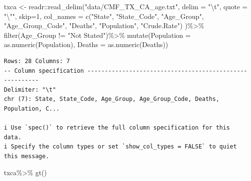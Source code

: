 \documentclass[
  letterpaper,
  DIV=11,
  numbers=noendperiod]{scrreprt}
\newenvironment{Shaded}{\begin{snugshade}}{\end{snugshade}}
\newcommand{\AttributeTok}[1]{\textcolor[rgb]{0.40,0.45,0.13}{#1}}
\newcommand{\DecValTok}[1]{\textcolor[rgb]{0.68,0.00,0.00}{#1}}
\newcommand{\FunctionTok}[1]{\textcolor[rgb]{0.28,0.35,0.67}{#1}}
\newcommand{\NormalTok}[1]{\textcolor[rgb]{0.00,0.23,0.31}{#1}}
\newcommand{\OtherTok}[1]{\textcolor[rgb]{0.00,0.23,0.31}{#1}}
\newcommand{\SpecialCharTok}[1]{\textcolor[rgb]{0.37,0.37,0.37}{#1}}
\newcommand{\StringTok}[1]{\textcolor[rgb]{0.13,0.47,0.30}{#1}}
\begin{document}
\begin{Shaded}
\begin{Highlighting}[]
\NormalTok{txca }\OtherTok{\textless{}{-}}\NormalTok{ readr}\SpecialCharTok{::}\FunctionTok{read\_delim}\NormalTok{(}\StringTok{"data/CMF\_TX\_CA\_age.txt"}\NormalTok{,}
                          \AttributeTok{delim =} \StringTok{"}\SpecialCharTok{\textbackslash{}t}\StringTok{"}\NormalTok{,}
                          \AttributeTok{quote =} \StringTok{"}\SpecialCharTok{\textbackslash{}"}\StringTok{"}\NormalTok{,}
                          \AttributeTok{skip=}\DecValTok{1}\NormalTok{,}
                          \AttributeTok{col\_names =} \FunctionTok{c}\NormalTok{(}\StringTok{"State"}\NormalTok{,}
                                        \StringTok{"State\_Code"}\NormalTok{,}
                                        \StringTok{"Age\_Group"}\NormalTok{,}
                                        \StringTok{"Age\_Group\_Code"}\NormalTok{,}
                                        \StringTok{"Deaths"}\NormalTok{,}
                                        \StringTok{"Population"}\NormalTok{,}
                                        \StringTok{"Crude.Rate"}\NormalTok{)}
\NormalTok{                          )}\SpecialCharTok{\%\textgreater{}\%}
  \FunctionTok{filter}\NormalTok{(Age\_Group }\SpecialCharTok{!=} \StringTok{"Not Stated"}\NormalTok{)}\SpecialCharTok{\%\textgreater{}\%}
  \FunctionTok{mutate}\NormalTok{(}\AttributeTok{Population =} \FunctionTok{as.numeric}\NormalTok{(Population), }\AttributeTok{Deaths =} \FunctionTok{as.numeric}\NormalTok{(Deaths))}
\end{Highlighting}
\end{Shaded}

\begin{verbatim}
Rows: 28 Columns: 7
-- Column specification --------------------------------------------------------
Delimiter: "\t"
chr (7): State, State_Code, Age_Group, Age_Group_Code, Deaths, Population, C...

i Use `spec()` to retrieve the full column specification for this data.
i Specify the column types or set `show_col_types = FALSE` to quiet this message.
\end{verbatim}

\begin{Shaded}
\begin{Highlighting}[]
\NormalTok{txca}\SpecialCharTok{\%\textgreater{}\%}
  \FunctionTok{gt}\NormalTok{()}
\end{Highlighting}
\end{Shaded}
\end{document}
